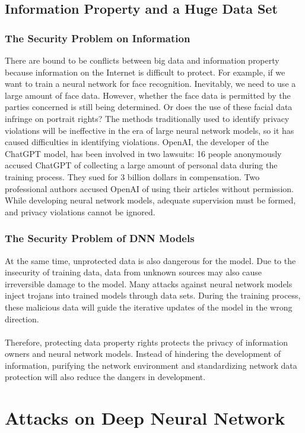 \documentclass[english,version-2022-01]{uzl-thesis}
\begin{document}
\section{Information Property and a Huge Data Set} 
\subsection{The Security Problem on Information} There are bound to be conflicts between big data and information property because information on the Internet is difficult to protect. For example, if we want to train a neural network for face recognition. Inevitably, we need to use a large amount of face data. However, whether the face data is permitted by the parties concerned is still being determined. Or does the use of these facial data infringe on portrait rights? The methods traditionally used to identify privacy violations will be ineffective in the era of large neural network models, so it has caused difficulties in identifying violations. OpenAI, the developer of the ChatGPT model, has been involved in two lawsuits: 16 people anonymously accused ChatGPT of collecting a large amount of personal data during the training process. They sued for 3 billion dollars in compensation. Two professional authors accused OpenAI of using their articles without permission.\cite{ChatGPT} While developing neural network models, adequate supervision must be formed, and privacy violations cannot be ignored.
\subsection{The Security Problem of DNN Models} At the same time, unprotected data is also dangerous for the model. Due to the insecurity of training data, data from unknown sources may also cause irreversible damage to the model. Many attacks against neural network models inject trojans into trained models through data sets. During the training process, these malicious data will guide the iterative updates of the model in the wrong direction. \\
\\
Therefore, protecting data property rights protects the privacy of information owners and neural network models. Instead of hindering the development of information, purifying the network environment and standardizing network data protection will also reduce the dangers in development.


\chapter{Attacks on Deep Neural Network}
\end{document}
